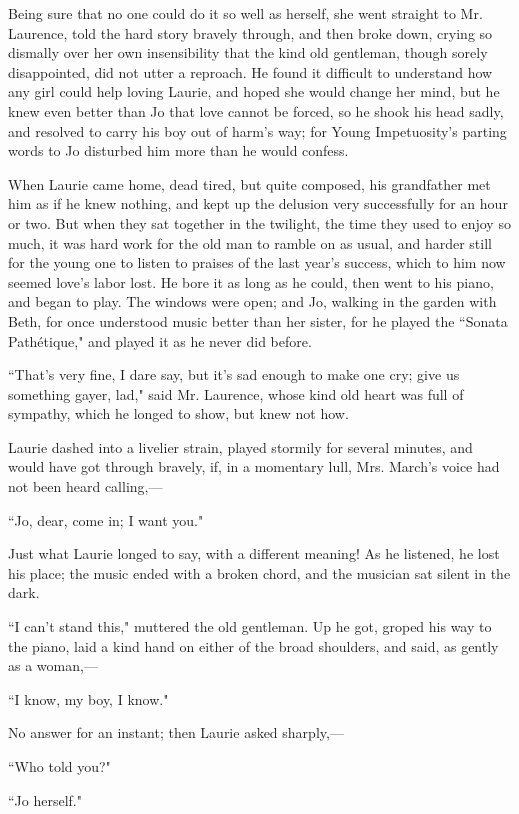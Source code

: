 Being sure that no one could do it so well as herself, she went straight
to Mr. Laurence, told the hard story bravely through, and then broke
down, crying so dismally over her own insensibility that the kind old
gentleman, though sorely disappointed, did not utter a reproach. He
found it difficult to understand how any girl could help loving Laurie,
and hoped she would change her mind, but he knew even better than Jo
that love cannot be forced, so he shook his head sadly, and resolved to
carry his boy out of harm's way; for Young
Impetuosity's parting words to Jo disturbed him more
than he would confess.

When Laurie came home, dead tired, but quite composed, his grandfather
met him as if he knew nothing, and kept up the delusion very
successfully for an hour or two. But when they sat together in the
twilight, the time they used to enjoy so much, it was hard work for the
old man to ramble on as usual, and harder still for the young one to
listen to praises of the last year's success, which to
him now seemed love's labor lost. He bore it as long as
he could, then went to his piano, and began to play. The windows were
open; and Jo, walking in the garden with Beth, for once understood music
better than her sister, for he played the ``Sonata Pathétique," and
played it as he never did before.

``That's very fine, I dare say, but it's
sad enough to make one cry; give us something gayer, lad," said Mr.
Laurence, whose kind old heart was full of sympathy, which he longed to
show, but knew not how.

Laurie dashed into a livelier strain, played stormily for several
minutes, and would have got through bravely, if, in a momentary lull,
Mrs. March's voice had not been heard calling,---

``Jo, dear, come in; I want you."

Just what Laurie longed to say, with a different meaning! As he
listened, he lost his place; the music ended with a broken chord, and
the musician sat silent in the dark.

``I can't stand this," muttered the old gentleman. Up he
got, groped his way to the piano, laid a kind hand on either of the
broad shoulders, and said, as gently as a woman,---

``I know, my boy, I know."

No answer for an instant; then Laurie asked sharply,---

``Who told you?"

``Jo herself."

